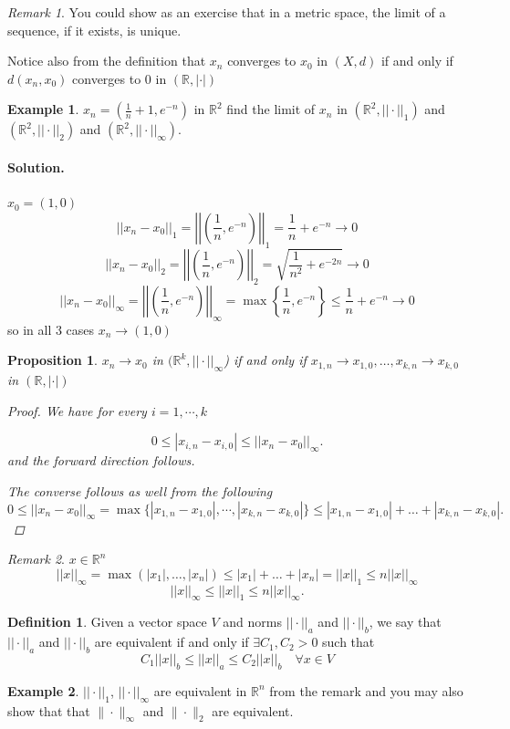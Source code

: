 \documentclass[11pt,openany]{book}
\theoremstyle{plain}
\newtheorem{proposition}{Proposition}[chapter]
\theoremstyle{definition}
\newtheorem{definition}{Definition}[chapter]
\newtheorem{example}{Example}[chapter]
\theoremstyle{remark}
\newtheorem{remark}{Remark}[chapter]
\newcommand{\R}{\mathbb{R}}
\begin{document}
\begin{remark}\rm
    You could show as an exercise that in a metric space, the limit of a sequence, if it exists, is unique.

    Notice also from the definition that $x_n$ converges to $x_0$ in $(X,d)$ if and only if $d(x_n, x_0)$ converges to $0$ in $(\R, |\cdot|)$
\end{remark}


\begin{example}
    $x_n = (\frac{1}{n}+1, e^{-n})$ in $\R^2$ find the limit of $x_n$ in $(\R^2, ||\cdot||_{1})$ and $(\R^2, ||\cdot||_{2})$ and $(\R^2, ||\cdot||_{\infty})$.
    \paragraph{\bf Solution.}
        $x_0 = (1,0)$
        \[ ||x_n - x_0||_1 = \left|\left|\left(\frac{1}{n}, e^{-n}\right)\right|\right|_1 = \frac{1}{n} + e^{-n} \to 0 \]
        \[ ||x_n - x_0||_2 = \left|\left|\left(\frac{1}{n}, e^{-n}\right)\right|\right|_2 = \sqrt{\frac{1}{n^2} + e^{-2n}} \to 0 \]
        \[ ||x_n - x_0||_{\infty} = \left|\left|\left(\frac{1}{n}, e^{-n}\right)\right|\right|_{\infty} = \max\left\{\frac{1}{n}, e^{-n}\right\} \le \frac{1}{n}+e^{-n} \to 0 \]
        so in all 3 cases $x_n \to (1,0)$
\end{example}
\begin{proposition} 
    $x_n \to x_0$ in $(\R^k, ||\cdot||_{\infty}$) if and only if $x_{1,n} \to x_{1,0}, \dots , x_{k,n} \to x_{k,0}$ in $(\R, |\cdot|)$
    \begin{proof}
        We have for every $i=1,\cdots,k$
        
        $$0\leq |x_{i,n} - x_{i,0}| \le ||x_n - x_0||_{\infty}.$$
        and the forward direction follows.

        The converse follows as well from the following
        $$0\leq ||x_n - x_0||_{\infty}=\max\{|x_{1,n}-x_{1,0}|,\cdots, |x_{k,n}-x_{k,0}|\}\le |x_{1,n} - x_{1,0}| + \dots + |x_{k,n} - x_{k,0}|.$$
    \end{proof}
\end{proposition}

\begin{remark}
    $x \in \R^n$ \[ ||x||_{\infty} = \max(|x_1|, \dots, |x_n|) \le |x_1|+\dots +|x_n| = ||x||_1 \le n||x||_{\infty}\]
    \[ ||x||_{\infty} \le ||x||_1 \le n||x||_{\infty} .\]
\end{remark}
\begin{definition}
    Given a vector space $V$ and norms $||\cdot||_{a}$ and $||\cdot||_{b}$, we say that $||\cdot||_{a}$ and $||\cdot||_{b}$ are equivalent if and only if $\exists C_1, C_2 >0$ such that \[ C_1||x||_{b} \le ||x||_{a} \le C_2 ||x||_{b} \quad \forall x \in V \]
\end{definition}
\begin{example}
    $||\cdot||_{1}$, $||\cdot||_{\infty}$ are equivalent in $\R^n$ from the remark and you may also show that that $\|\cdot\|_\infty$ and $\|\cdot\|_2$ are equivalent.
\end{example}
\end{document}
